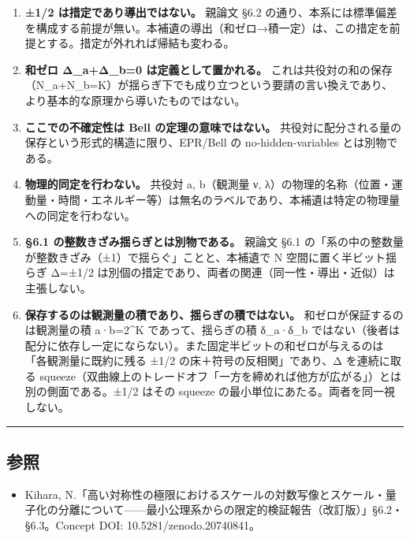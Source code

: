 \documentclass[11pt]{ltjsarticle}
\providecommand{\tightlist}{\setlength{\itemsep}{0pt}\setlength{\parskip}{0pt}}
\begin{document}
\begin{enumerate}
\def\labelenumi{\arabic{enumi}.}
\item
  \textbf{±1/2 は措定であり導出ではない。} 親論文 §6.2
  の通り、本系には標準偏差を構成する前提が無い。本補遺の導出（和ゼロ→積一定）は、この措定を前提とする。措定が外れれば帰結も変わる。
\item
  \textbf{和ゼロ Δ\_a+Δ\_b=0 は定義として置かれる。}
  これは共役対の和の保存（N\_a+N\_b=K）が揺らぎ下でも成り立つという要請の言い換えであり、より基本的な原理から導いたものではない。
\item
  \textbf{ここでの不確定性は Bell の定理の意味ではない。}
  共役対に配分される量の保存という形式的構造に限り、EPR/Bell の
  no-hidden-variables とは別物である。
\item
  \textbf{物理的同定を行わない。} 共役対 a, b（観測量 ν,
  λ）の物理的名称（位置・運動量・時間・エネルギー等）は無名のラベルであり、本補遺は特定の物理量への同定を行わない。
\item
  \textbf{§6.1 の整数きざみ揺らぎとは別物である。} 親論文 §6.1
  の「系の中の整数量が整数きざみ（±1）で揺らぐ」ことと、本補遺で N
  空間に置く半ビット揺らぎ Δ=±1/2
  は別個の措定であり、両者の関連（同一性・導出・近似）は主張しない。
\item
  \textbf{保存するのは観測量の積であり、揺らぎの積ではない。}
  和ゼロが保証するのは観測量の積 a·b=2\^{}K であって、揺らぎの積
  δ\_a·δ\_b
  ではない（後者は配分に依存し一定にならない）。また固定半ビットの和ゼロが与えるのは「各観測量に既約に残る
  ±1/2 の床＋符号の反相関」であり、Δ を連続に取る
  squeeze（双曲線上のトレードオフ「一方を締めれば他方が広がる」）とは別の側面である。±1/2
  はその squeeze の最小単位にあたる。両者を同一視しない。
\end{enumerate}

\begin{center}\rule{0.5\linewidth}{0.5pt}\end{center}

\subsection{参照}\label{ux53c2ux7167}

\begin{itemize}
\tightlist
\item
  Kihara,
  N.「高い対称性の極限におけるスケールの対数写像とスケール・量子化の分離について------最小公理系からの限定的検証報告（改訂版）」§6.2・§6.3。Concept
  DOI: 10.5281/zenodo.20740841。
\end{itemize}
\end{document}

